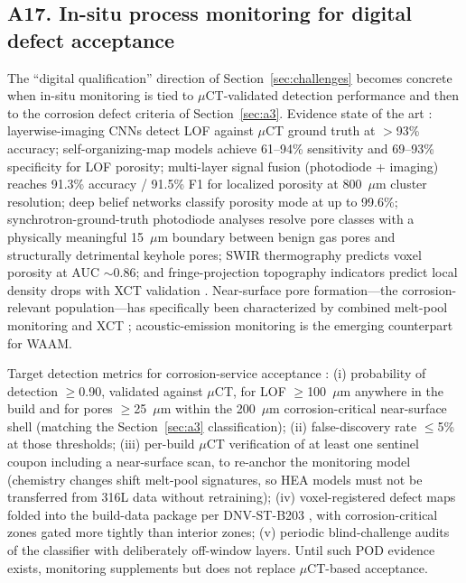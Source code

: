 

\subsection{A17. In-situ process monitoring for digital defect acceptance}
\label{sec:a17}

The ``digital qualification'' direction of Section~\ref{sec:challenges} becomes concrete when in-situ monitoring is tied to $\mu$CT-validated detection performance and then to the corrosion defect criteria of Section~\ref{sec:a3}. Evidence state of the art \evid{}: layerwise-imaging CNNs detect LOF against $\mu$CT ground truth at $>$93\% accuracy; self-organizing-map models achieve 61--94\% sensitivity and 69--93\% specificity for LOF porosity; multi-layer signal fusion (photodiode + imaging) reaches 91.3\% accuracy / 91.5\% F1 for localized porosity at 800~$\mu$m cluster resolution; deep belief networks classify porosity mode at up to 99.6\%; synchrotron-ground-truth photodiode analyses resolve pore classes with a physically meaningful 15~$\mu$m boundary between benign gas pores and structurally detrimental keyhole pores; SWIR thermography predicts voxel porosity at AUC $\sim$0.86; and fringe-projection topography indicators predict local density drops with XCT validation \cite{monitor_keyhole2025,monitor_cnn2026,monitor_fringe2024}. Near-surface pore formation---the corrosion-relevant population---has specifically been characterized by combined melt-pool monitoring and XCT \cite{kim2021nearsurface}; acoustic-emission monitoring is the emerging counterpart for WAAM.

Target detection metrics for corrosion-service acceptance \prop{}: (i) probability of detection $\geq$0.90, validated against $\mu$CT, for LOF $\geq$100~$\mu$m anywhere in the build and for pores $\geq$25~$\mu$m within the 200~$\mu$m corrosion-critical near-surface shell (matching the Section~\ref{sec:a3} classification); (ii) false-discovery rate $\leq$5\% at those thresholds; (iii) per-build $\mu$CT verification of at least one sentinel coupon including a near-surface scan, to re-anchor the monitoring model (chemistry changes shift melt-pool signatures, so HEA models must not be transferred from 316L data without retraining); (iv) voxel-registered defect maps folded into the build-data package per DNV-ST-B203 \cite{dnvstb203}, with corrosion-critical zones gated more tightly than interior zones; (v) periodic blind-challenge audits of the classifier with deliberately off-window layers. Until such POD evidence exists, monitoring supplements but does not replace $\mu$CT-based acceptance.

